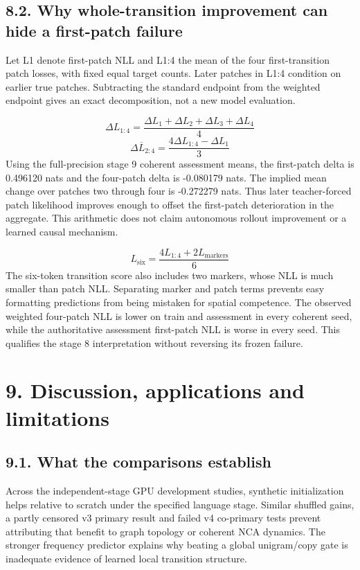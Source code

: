 \documentclass[11pt,a4paper]{article}
\begin{document}
\subsection*{8.2. Why whole-transition improvement can hide a first-patch failure}
Let L1 denote first-patch NLL and L1:4 the mean of the four first-transition patch losses, with fixed equal target counts. Later patches in L1:4 condition on earlier true patches. Subtracting the standard endpoint from the weighted endpoint gives an exact decomposition, not a new model evaluation.

\begin{equation}
\Delta L_{1:4}=\frac{\Delta L_1+\Delta L_2+\Delta L_3+\Delta L_4}{4}
\end{equation}
\begin{equation}
\Delta\overline{L}_{2:4}=\frac{4\Delta L_{1:4}-\Delta L_1}{3}
\end{equation}
Using the full-precision stage 9 coherent assessment means, the first-patch delta is 0.496120 nats and the four-patch delta is -0.080179 nats. The implied mean change over patches two through four is -0.272279 nats. Thus later teacher-forced patch likelihood improves enough to offset the first-patch deterioration in the aggregate. This arithmetic does not claim autonomous rollout improvement or a learned causal mechanism.

\begin{equation}
L_{\mathrm{six}}=\frac{4L_{1:4}+2L_{\mathrm{markers}}}{6}
\end{equation}
The six-token transition score also includes two markers, whose NLL is much smaller than patch NLL. Separating marker and patch terms prevents easy formatting predictions from being mistaken for spatial competence. The observed weighted four-patch NLL is lower on train and assessment in every coherent seed, while the authoritative assessment first-patch NLL is worse in every seed. This qualifies the stage 8 interpretation without reversing its frozen failure.

\section*{9. Discussion, applications and limitations}
\subsection*{9.1. What the comparisons establish}
Across the independent-stage GPU development studies, synthetic initialization helps relative to scratch under the specified language stage. Similar shuffled gains, a partly censored v3 primary result and failed v4 co-primary tests prevent attributing that benefit to graph topology or coherent NCA dynamics. The stronger frequency predictor explains why beating a global unigram/\allowbreak{}copy gate is inadequate evidence of learned local transition structure.
\end{document}
